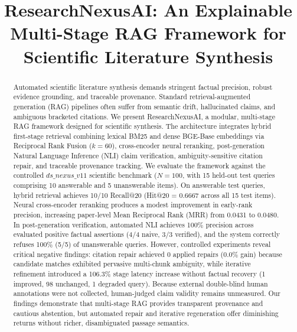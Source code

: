 \documentclass[conference]{IEEEtran}
\begin{document}
\title{ResearchNexusAI: An Explainable Multi-Stage RAG Framework for Scientific Literature Synthesis}

\author{
}

\maketitle

\begin{abstract}
Automated scientific literature synthesis demands stringent factual precision, robust evidence grounding, and traceable provenance. Standard retrieval-augmented generation (RAG) pipelines often suffer from semantic drift, hallucinated claims, and ambiguous bracketed citations. We present ResearchNexusAI, a modular, multi-stage RAG framework designed for scientific synthesis. The architecture integrates hybrid first-stage retrieval combining lexical BM25 and dense BGE-Base embeddings via Reciprocal Rank Fusion ($k=60$), cross-encoder neural reranking, post-generation Natural Language Inference (NLI) claim verification, ambiguity-sensitive citation repair, and traceable provenance tracking. We evaluate the framework against the controlled $ds\_nexus\_v11$ scientific benchmark ($N=100$, with 15 held-out test queries comprising 10 answerable and 5 unanswerable items). On answerable test queries, hybrid retrieval achieves 10/10 Recall@20 (Hit@20 = 0.6667 across all 15 test items). Neural cross-encoder reranking produces a modest improvement in early-rank precision, increasing paper-level Mean Reciprocal Rank (MRR) from 0.0431 to 0.0480. In post-generation verification, automated NLI achieves 100\% precision across evaluated positive factual assertions (4/4 naive, 3/3 verified), and the system correctly refuses 100\% (5/5) of unanswerable queries. However, controlled experiments reveal critical negative findings: citation repair achieved 0 applied repairs (0.0\% gain) because candidate matches exhibited pervasive multi-chunk ambiguity, while iterative refinement introduced a 106.3\% stage latency increase without factual recovery (1 improved, 98 unchanged, 1 degraded query). Because external double-blind human annotations were not collected, human-judged claim validity remains unmeasured. Our findings demonstrate that multi-stage RAG provides transparent provenance and cautious abstention, but automated repair and iterative regeneration offer diminishing returns without richer, disambiguated passage semantics.
\end{abstract}
\end{document}
